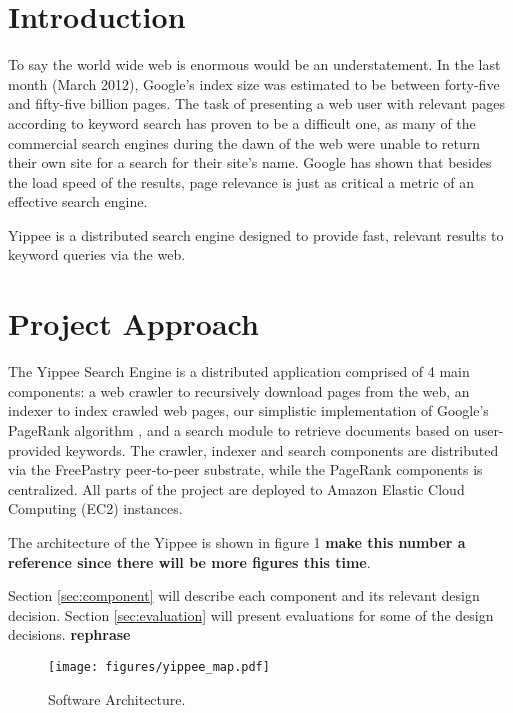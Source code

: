 \documentclass[11pt, letterpaper, oneside, twocolumn]{article}
\begin{document}
\section{ Introduction }

To say the world wide web is enormous would be an understatement.  
In the last month (March 2012),  Google's index size was estimated to be between forty-five and fifty-five billion pages.\cite{websize}
The task of presenting a web user with relevant pages according to keyword search has proven to be a difficult one, as many of the commercial search engines during the dawn of the web were unable to return their own site for a search for their site's name.\cite{google} 
Google has shown that besides the load speed of the results, page relevance is just as critical a metric of an effective search engine. 

Yippee is a distributed search engine designed to provide fast, relevant results to keyword queries via the web.  

\section{Project Approach}
\label{sec:approach}

The Yippee Search Engine is a distributed application comprised of 4 main components: a web crawler to recursively download pages from the web, an indexer to index crawled web pages, our simplistic implementation of Google's PageRank algorithm \cite{pagerank}, and a search module to retrieve documents based on user-provided keywords.  
The crawler, indexer and search components are distributed via the FreePastry peer-to-peer substrate, while the PageRank components is centralized.  All parts of the project are deployed to Amazon Elastic Cloud Computing (EC2) instances.  

The architecture of the Yippee is shown in figure 1 \textbf{make this number a reference since there will be more figures this time}.


Section \ref{sec:component} will describe each component and its relevant design decision.
Section \ref{sec:evaluation} will present evaluations for some of the design decisions. \textbf{rephrase}


\label{sec:SOAR} %
\begin{figure}[!b]
  \centering
  \texttt{[image: figures/yippee\_map.pdf]}
  \caption{Software Architecture.}
\end{figure}
\end{document}
